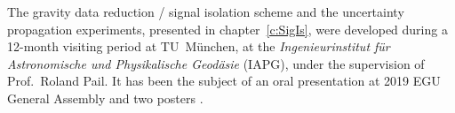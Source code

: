 The gravity data reduction / signal isolation scheme and the uncertainty propagation experiments, presented in chapter~\ref{c:SigIs}, were developed during a 12-month visiting period at TU~München, at the \textit{Ingenieurinstitut für Astronomische und Physikalische Geodäsie} (IAPG), under the supervision of Prof.~Roland Pail.
It has been the subject of an oral presentation at 2019 EGU General Assembly \parencite{Pastorutti2019EGU} and two posters \parencites{Pastorutti2019LPS}{Pastorutti2019IUGG}.
